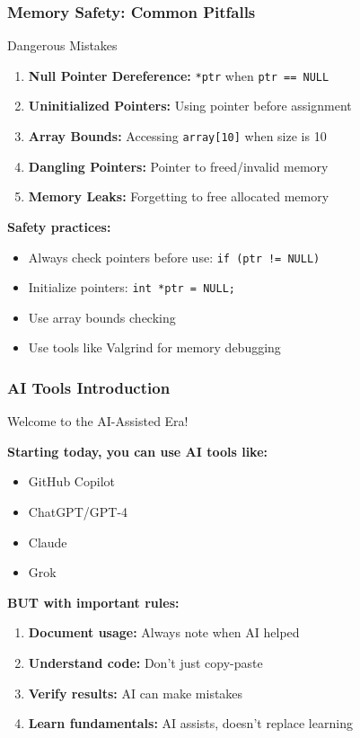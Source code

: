 \documentclass{beamer}
\begin{document}
\begin{frame}
\frametitle{Memory Safety: Common Pitfalls}
\begin{alertblock}{Dangerous Mistakes}
\begin{enumerate}
    \item \textbf{Null Pointer Dereference:} \texttt{*ptr} when \texttt{ptr == NULL}
    \item \textbf{Uninitialized Pointers:} Using pointer before assignment
    \item \textbf{Array Bounds:} Accessing \texttt{array[10]} when size is 10
    \item \textbf{Dangling Pointers:} Pointer to freed/invalid memory
    \item \textbf{Memory Leaks:} Forgetting to free allocated memory
\end{enumerate}
\end{alertblock}

\vspace{0.5cm}
\textbf{Safety practices:}
\begin{itemize}
    \item Always check pointers before use: \texttt{if (ptr != NULL)}
    \item Initialize pointers: \texttt{int *ptr = NULL;}
    \item Use array bounds checking
    \item Use tools like Valgrind for memory debugging
\end{itemize}
\end{frame}

\begin{frame}
\frametitle{AI Tools Introduction}
\begin{center}
\Large Welcome to the AI-Assisted Era!
\end{center}

\textbf{Starting today, you can use AI tools like:}
\begin{itemize}
    \item GitHub Copilot
    \item ChatGPT/GPT-4
    \item Claude
    \item Grok
\end{itemize}

\vspace{0.5cm}
\textbf{BUT with important rules:}
\begin{enumerate}
    \item \textbf{Document usage:} Always note when AI helped
    \item \textbf{Understand code:} Don't just copy-paste
    \item \textbf{Verify results:} AI can make mistakes
    \item \textbf{Learn fundamentals:} AI assists, doesn't replace learning
\end{enumerate}
\end{frame}
\end{document}
